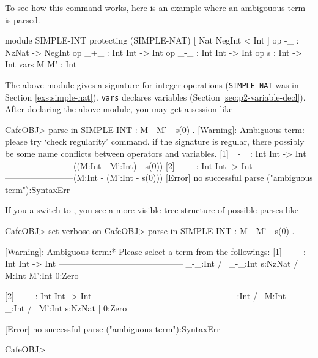 \documentclass[a4paper]{memoir}
\begin{document}
To see how this command works, here is an example where an ambigouous term
is parsed.
\label{exs:simple-int}
\begin{vvtm}
\begin{ccode}
  module SIMPLE-INT {
    protecting (SIMPLE-NAT)
    [ Nat NegInt < Int ]
    op -_ : NzNat -> NegInt
    op _+_ : Int Int -> Int
    op _-_ : Int Int -> Int
    op s : Int -> Int
    vars M M' : Int
  }
\end{ccode}
\end{vvtm}
The above module gives a signature for integer operations
(\verb|SIMPLE-NAT| was in Section \ref{exs:simple-nat}).
\verb|vars| declares
variables (Section \ref{sec:p2-variable-decl}). After declaring
the above module, you may get a session like
\begin{vvtm}
\begin{ccode}
  CafeOBJ> parse in SIMPLE-INT : M - M' - s(0) .
  [Warning]: Ambiguous term:
      please try `check regularity' command.
      if the signature is regular, there possibly be 
      some name conflicts between operators and variables.
  [1] _-_ : Int Int -> Int ------------------------((M:Int - M':Int) - s(0))
  [2] _-_ : Int Int -> Int ------------------------(M:Int - (M':Int - s(0)))
  [Error] no successful parse
    ("ambiguous term"):SyntaxErr
\end{ccode}
\end{vvtm}
If you  a switch  to , 
you see a more visible tree structure of possible parses like
\begin{vvtm}
\begin{ccode}
  CafeOBJ> set verbose on
  CafeOBJ> parse in SIMPLE-INT : M - M' - s(0) .

  [Warning]: Ambiguous term:* Please select a term from the followings:
  [1] _-_ : Int Int -> Int --------------------------------------------
            _-_:Int        
        /             \     
     _-_:Int       s:NzNat
    /       \         |     
  M:Int  M':Int    0:Zero  
                          
  [2] _-_ : Int Int -> Int --------------------------------------------
       _-_:Int             
    /            \          
  M:Int       _-_:Int      
            /         \     
         M':Int    s:NzNat
                      |     
                   0:Zero  

  [Error] no successful parse
    ("ambiguous term"):SyntaxErr

  CafeOBJ> 
\end{ccode}
\end{vvtm}
\end{document}
